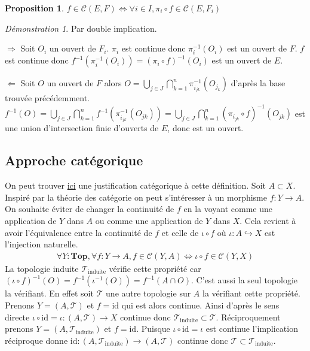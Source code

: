 \documentclass[a4paper, 11pt, french]{book}
\newenvironment{centre}{\center}{\endcenter}
\newenvironment{itemise}{\itemize}{\enditemize}
\theoremstyle{plain} %
\newtheorem{proposition}{Proposition}
\theoremstyle{definition} %
\theoremstyle{remark} %
\newtheorem*{demonstration}{Démonstration}
\newcommand{\1}{\mathds{1}}
\newcommand{\id}{\mathrm{id}}
\newcommand{\inv}[1]{#1^{-1}}
\renewcommand{\cal}[1]{\mathcal{#1}}
\newcommand{\scr}[1]{\mathscr{#1}}
\newcommand{\rm}[1]{\mathrm{#1}}
\newcommand\equivalence[3]{
	\begin{demonstration}
		#1
		\begin{itemise}
			\item[$\Longrightarrow$] #2
			\item[$\Longleftarrow$] #3
		\end{itemise}
	\end{demonstration}
}
\begin{document}
\begin{proposition}
	$f\in\cal{C}(E, F)\iff\forall i\in I, \pi_i\circ f\in\cal{C}(E, F_i)$
\end{proposition}

\equivalence{Par double implication.}{
	Soit $O_i$ un ouvert de $F_i$.
		$\pi_i$ est continue donc $\inv{\pi_i}(O_i)$ est un ouvert de $F$.
		$f$ est continue donc $\inv{f}(\inv{\pi_i}(O_i))=\inv{(\pi_i\circ f)}(O_i)$ est un ouvert de $E$.
}{
	Soit $O$ un ouvert de $F$ alors $O=\bigcup_{j\in J}\bigcap_{k=1}^n\inv{\pi_{i_{jk}}}(O_{j_k})$ d'après la base trouvée précédemment.
		$\inv{f}(O)=\bigcup_{j\in J}\bigcap_{k=1}^n\inv{f}(\inv{\pi_{i_{jk}}}(O_{jk}))=\bigcup_{j\in J}\bigcap_{k=1}^n\inv{(\pi_{i_{jk}}\circ f)}(O_{jk})$ est une union d'intersection finie d'ouverts de $E$, donc est un ouvert.
}

\subsection{Approche catégorique}

On peut trouver \href{https://www.youtube.com/watch?v=xMmQrqdOkwI}{ici} une justification catégorique à cette définition.
Soit $A\subset X$.
Inspiré par la théorie des catégorie on peut s'intéresser à un morphisme $f\colon Y\rightarrow A$.
On souhaite éviter de changer la continuité de $f$ en la voyant comme une application de $Y$ dans $A$ ou comme une application de $Y$ dans $X$.
Cela revient à avoir l'équivalence entre la continuité de $f$ et celle de $\iota\circ f$ où $\iota\colon A\hookrightarrow X$ est l'injection naturelle.
\begin{align*}
\forall Y\colon\mathbf{Top}, \forall f\colon Y\rightarrow A, f\in\mathcal{C}(Y, A)\iff \iota\circ f\in\mathcal{C}(Y, X)
\end{align*}
La topologie induite $\scr{T}_\rm{induite}$ vérifie cette propriété car $(\iota\circ f)^{-1}(O)=f^{-1}(\iota^{-1}(O))=f^{-1}(A\cap O)$.
C'est aussi la seul topologie la vérifiant.
En effet soit $\scr{T}$ une autre topologie sur $A$ la vérifiant cette propriété.
Prenons $Y=(A, \scr{T})$ et $f=\id$ qui est alors continue.
Ainsi d'après le sens directe $\iota\circ\id=\iota\colon(A, \scr{T})\rightarrow X$ continue donc $\scr{T}_\rm{induite}\subset\scr{T}$.
Réciproquement prenons $Y=(A, \scr{T}_\rm{induite})$ et $f=\id$.
Puisque $\iota\circ\id=\iota$ est continue l'implication réciproque donne $\id\colon(A, \scr{T}_\rm{induite})\rightarrow(A, \scr{T})$ continue donc $\scr{T}\subset\scr{T}_\rm{induite}$.
\end{document}
